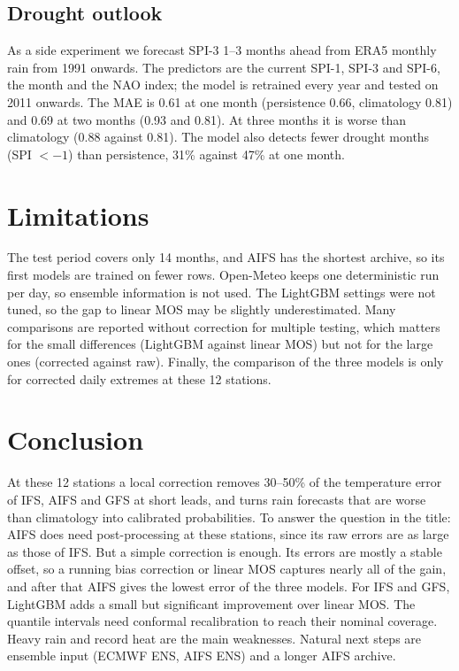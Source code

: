 \documentclass{article}
\begin{document}
\subsection{Drought outlook}
As a side experiment we forecast SPI-3 \citep{mckee1993spi} 1--3 months ahead from ERA5 monthly rain \citep{hersbach2020} from 1991 onwards. The predictors are the current SPI-1, SPI-3 and SPI-6, the month and the NAO index; the model is retrained every year and tested on 2011 onwards. The MAE is 0.61 at one month (persistence 0.66, climatology 0.81) and 0.69 at two months (0.93 and 0.81). At three months it is worse than climatology (0.88 against 0.81). The model also detects fewer drought months (SPI $<-1$) than persistence, 31\% against 47\% at one month.

\section{Limitations}
\label{sec:limits}
The test period covers only 14 months, and AIFS has the shortest archive, so its first models are trained on fewer rows. Open-Meteo keeps one deterministic run per day, so ensemble information is not used. The LightGBM settings were not tuned, so the gap to linear MOS may be slightly underestimated. Many comparisons are reported without correction for multiple testing, which matters for the small differences (LightGBM against linear MOS) but not for the large ones (corrected against raw). Finally, the comparison of the three models is only for corrected daily extremes at these 12 stations.

\section{Conclusion}
\label{sec:conclusion}
At these 12 stations a local correction removes 30--50\% of the temperature error of IFS, AIFS and GFS at short leads, and turns rain forecasts that are worse than climatology into calibrated probabilities. To answer the question in the title: AIFS does need post-processing at these stations, since its raw errors are as large as those of IFS. But a simple correction is enough. Its errors are mostly a stable offset, so a running bias correction or linear MOS captures nearly all of the gain, and after that AIFS gives the lowest error of the three models. For IFS and GFS, LightGBM adds a small but significant improvement over linear MOS. The quantile intervals need conformal recalibration to reach their nominal coverage. Heavy rain and record heat are the main weaknesses. Natural next steps are ensemble input (ECMWF ENS, AIFS ENS) and a longer AIFS archive.
\end{document}
